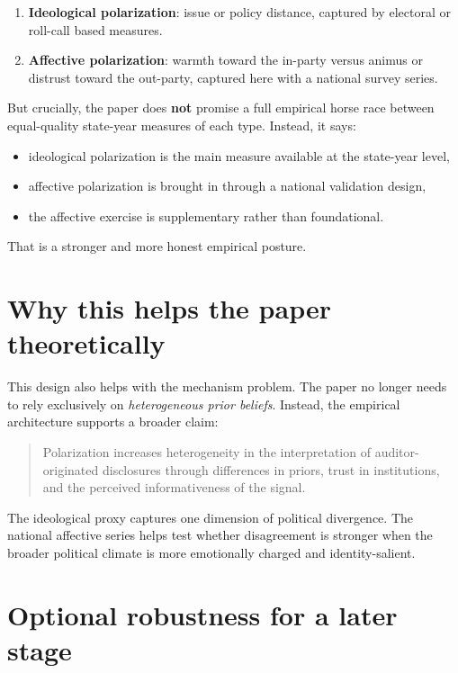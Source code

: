 \documentclass[12pt]{article}
\begin{document}
\begin{enumerate}[leftmargin=1.5em]
    \item \textbf{Ideological polarization}: issue or policy distance, captured by electoral or roll-call based measures.
    \item \textbf{Affective polarization}: warmth toward the in-party versus animus or distrust toward the out-party, captured here with a national survey series.
\end{enumerate}

But crucially, the paper does \textbf{not} promise a full empirical horse race between equal-quality state-year measures of each type. Instead, it says:
\begin{itemize}[leftmargin=1.5em]
    \item ideological polarization is the main measure available at the state-year level,
    \item affective polarization is brought in through a national validation design,
    \item the affective exercise is supplementary rather than foundational.
\end{itemize}

That is a stronger and more honest empirical posture.

\section{Why this helps the paper theoretically}

This design also helps with the mechanism problem. The paper no longer needs to rely exclusively on \emph{heterogeneous prior beliefs}. Instead, the empirical architecture supports a broader claim:

\begin{quote}
Polarization increases heterogeneity in the interpretation of auditor-originated disclosures through differences in priors, trust in institutions, and the perceived informativeness of the signal.
\end{quote}

The ideological proxy captures one dimension of political divergence. The national affective series helps test whether disagreement is stronger when the broader political climate is more emotionally charged and identity-salient.

\section{Optional robustness for a later stage}
\end{document}
